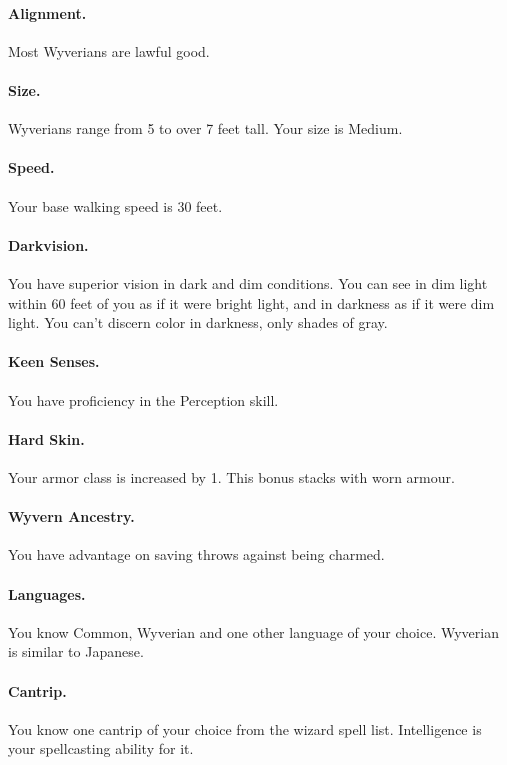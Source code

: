 \paragraph{Alignment.} Most Wyverians are lawful good.

\paragraph{Size.} Wyverians range from 5 to over 7 feet tall. Your size is Medium.

\paragraph{Speed.} Your base walking speed is 30 feet.

\paragraph{Darkvision.} You have superior vision in dark and dim conditions. You can see in dim light within 60 feet of you as if it were bright light, and in darkness as if it were dim light. You can't discern color in darkness, only shades of gray.

\paragraph{Keen Senses.} You have proficiency in the Perception skill.

\paragraph{Hard Skin.} Your armor class is increased by 1. This bonus stacks with worn armour.

\paragraph{Wyvern Ancestry.} You have advantage on saving throws against being charmed.

\paragraph{Languages.} You know Common, Wyverian and one other language of your choice. Wyverian is similar to Japanese.

\paragraph{Cantrip.} You know one cantrip of your choice from the wizard spell list. Intelligence is your spellcasting ability for it.

